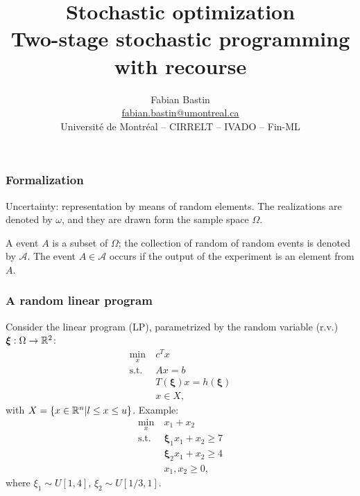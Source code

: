 \documentclass{beamer}
\author[Fabian Bastin]{Fabian Bastin \\ \url{fabian.bastin@umontreal.ca} \\ Université de Montréal -- CIRRELT -- IVADO -- Fin-ML}
\date{}
\title[Two-stage SP]{Stochastic optimization\\Two-stage stochastic programming with recourse}
\def\bxi{\boldsymbol\xi}
\def\bxi{\boldsymbol\xi}
\begin{document}
\frame{\titlepage}

\begin{frame}
	\frametitle{Formalization}
	
	Uncertainty: representation by means of {\red random elements}.
	The realizations are denoted by $\omega$, and they are drawn form the sample space $\Omega$.
	
	\mbox{}
	
	A {\red event} $A$ is a subset of $\Omega$; the collection of random of random events is denoted by $\mathcal{A}$.
	The event $A \in \mathcal{A}$ occurs if the output of the experiment is an element from $A$.
	
\end{frame}

\begin{frame}
	\frametitle{A random linear program}
	
	Consider the linear program (LP), parametrized by the random variable (r.v.) $\bxi: \Omega \rightarrow \RR^2$:
	\begin{align*}
		\min_x\ & c^T x \\
		\mbox{s.t. } & Ax = b \\
		& T(\bxi)x = h(\bxi) \\
		& x \in X,
	\end{align*}
	with $X = \lbrace x \in {\mathbb{R}}^n | l \leq x \leq u \rbrace$. Example:
	\begin{align*}
		\min_x\ & x_1+x_2\\
		\mbox{s.t. } & \bxi_1x_1 + x_2 \geq 7 \\
		& \bxi_2x_1 + x_2 \geq 4 \\
		& x_1, x_2 \geq 0,
	\end{align*}
	where $\xi_1 \sim U[1,4]$, $\xi_2\sim U[1/3,1]$.
\end{frame}
\end{document}
